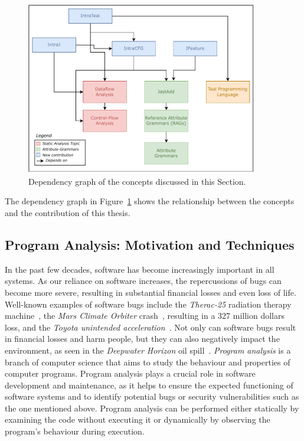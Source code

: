 \usetikzlibrary{backgrounds}
\begin{figure}[h]
    \centering
    \includegraphics[width=0.9\textwidth]{kappa/img/Dependencies.pdf}
  \caption{\label{fig:dependencygraph}Dependency graph of the concepts discussed in this Section.}
\end{figure}
The dependency graph in Figure~\ref{fig:dependencygraph} shows the relationship between
the concepts and the contribution of this thesis.

\subsection{Program Analysis: Motivation and Techniques}
In the past few decades, software has become increasingly important in all systems.
As our reliance on software increases, the repercussions of bugs can become more severe,
resulting in substantial financial losses and even loss of life.
Well-known examples of software bugs include the \emph{Therac-25} radiation therapy machine~\cite{leveson1993investigation},
the \emph{Mars Climate Orbiter} crash~\cite{Sawyer1999}, resulting in a 327 million dollars loss, and the \emph{Toyota unintended acceleration}~\cite{kane2010toyota}.
Not only can software bugs result in ﬁnancial losses and harm people, but they can also negatively impact the environment,
as seen in the \emph{Deepwater Horizon} oil spill~\cite{Shafer2010Oil}.
\emph{Program analysis} is a branch of computer science that aims to study the behaviour
and properties of computer programs. Program analysis plays a crucial role in software
development and maintenance, as it helps to ensure the expected functioning of software
systems and to identify potential bugs or security vulnerabilities such as the one mentioned above.
Program analysis can be performed either statically by examining the code without executing it
or dynamically by observing the program's behaviour during execution.


